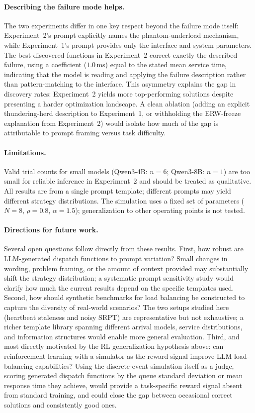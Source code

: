 \documentclass[11pt]{article}
\begin{document}
\paragraph{Describing the failure mode helps.}
The two experiments differ in one key respect beyond the failure mode
itself: Experiment~2's prompt explicitly names the phantom-underload
mechanism, while Experiment~1's prompt provides only the interface
and system parameters.
The best-discovered functions in Experiment~2 correct exactly the
described failure, using a coefficient ($1.0$\,ms) equal to the
stated mean service time, indicating that the model is reading and
applying the failure description rather than pattern-matching to the
interface.
This asymmetry explains the gap in discovery rates: Experiment~2
yields more top-performing solutions despite presenting a harder
optimization landscape.
A clean ablation (adding an explicit thundering-herd description to
Experiment~1, or withholding the ERW-freeze explanation from
Experiment~2) would isolate how much of the gap is attributable
to prompt framing versus task difficulty.

\paragraph{Limitations.}
Valid trial counts for small models (Qwen3-4B: $n{=}6$;
Qwen3-8B: $n{=}1$) are too small for reliable inference in
Experiment~2 and should be treated as qualitative.
All results are from a single prompt template; different prompts
may yield different strategy distributions.
The simulation uses a fixed set of parameters ($N{=}8$, $\rho{=}0.8$,
$\alpha{=}1.5$); generalization to other operating points is not tested.

\paragraph{Directions for future work.}
Several open questions follow directly from these results.
First, how robust are LLM-generated dispatch functions to prompt
variation? Small changes in wording, problem framing, or the amount
of context provided may substantially shift the strategy distribution;
a systematic prompt sensitivity study would clarify how much the
current results depend on the specific templates used.
Second, how should synthetic benchmarks for load balancing be
constructed to capture the diversity of real-world scenarios?
The two setups studied here (heartbeat staleness and noisy SRPT) are
representative but not exhaustive; a richer template library spanning
different arrival models, service distributions, and information
structures would enable more general evaluation.
Third, and most directly motivated by the RL generalization
hypothesis above: can reinforcement learning with a simulator as
the reward signal improve LLM load-balancing capabilities?
Using the discrete-event simulation itself as a judge, scoring
generated dispatch functions by the queue standard deviation or mean
response time they achieve, would provide a task-specific reward
signal absent from standard training, and could close the gap between
occasional correct solutions and consistently good ones.
\end{document}
